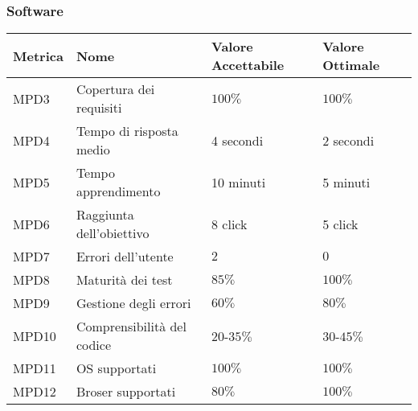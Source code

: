 \subsubsection{Software}
\begin{center}
  \begin{tabular}{|p{2cm}|p{4cm}|p{4cm}|p{3.5cm}|} \hline
    \textbf{Metrica} & \textbf{Nome} & \textbf{Valore Accettabile} & \textbf{Valore Ottimale}    \\ \hline
      MPD3 & Copertura dei requisiti & $100\%$ & $100\%$  \\ \hline
      MPD4 & Tempo di risposta medio    &  4 secondi  &  2 secondi   \\ \hline
      MPD5 & Tempo apprendimento    & 10 minuti  & 5 minuti       \\ \hline
      MPD6 & Raggiunta dell'obiettivo    & 8 click   & 5 click     \\ \hline
      MPD7 & Errori dell'utente    & $2$      & $0$        \\ \hline
      MPD8 & Maturità dei test    & $85\%$ &  $100\%$    \\ \hline
      MPD9 & Gestione degli errori    & $60\%$ & $80\%$     \\ \hline
      MPD10 & Comprensibilità del codice    & $20$-$35\%$ & $30$-$45\%$     \\ \hline
      MPD11 & OS supportati    & $100\%$ & $100\%$     \\ \hline
      MPD12 & Broser supportati    & $80\%$ & $100\%$     \\ \hline
  \end{tabular}
\end{center}

